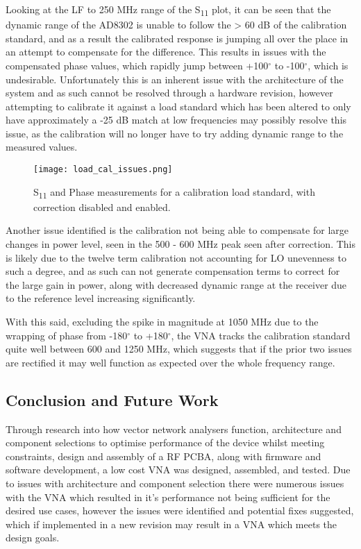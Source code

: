 Looking at the LF to 250 MHz range of the S\textsubscript{11} plot, it can be seen that the dynamic range of the AD8302 is unable to follow the > 60 dB of the calibration standard, and as a result the calibrated response is jumping all over the place in an attempt to compensate for the difference. This results in issues with the compensated phase values, which rapidly jump between +100$^\circ$ to -100$^\circ$, which is undesirable. Unfortunately this is an inherent issue with the architecture of the system and as such cannot be resolved through a hardware revision, however attempting to calibrate it against a load standard which has been altered to only have approximately a -25 dB match at low frequencies may possibly resolve this issue, as the calibration will no longer have to try adding dynamic range to the measured values. 

\begin{figure}[H]
	\centering
	\texttt{[image: load\_cal\_issues.png]}
	\caption{S\textsubscript{11} and Phase measurements for a calibration load standard, with correction disabled and enabled.}
	\label{fig:cal_sucks}
\end{figure}

Another issue identified is the calibration not being able to compensate for large changes in power level, seen in the 500 - 600 MHz peak seen after correction. This is likely due to the twelve term calibration not accounting for LO unevenness to such a degree, and as such can not generate compensation terms to correct for the large gain in power, along with decreased dynamic range at the receiver due to the reference level increasing significantly. 

With this said, excluding the spike in magnitude at 1050 MHz due to the wrapping of phase from -180$^\circ$ to +180$^\circ$, the VNA tracks the calibration standard quite well between 600 and 1250 MHz, which suggests that if the prior two issues are rectified it may well function as expected over the whole frequency range. 

\subsection{Conclusion and Future Work}
Through research into how vector network analysers function, architecture and component selections to optimise performance of the device whilst meeting constraints, design and assembly of a RF PCBA, along with firmware and software development, a low cost VNA was designed, assembled, and tested. Due to issues with architecture and component selection there were numerous issues with the VNA which resulted in it's performance not being sufficient for the desired use cases, however the issues were identified and potential fixes suggested, which if implemented in a new revision may result in a VNA which meets the design goals. 

